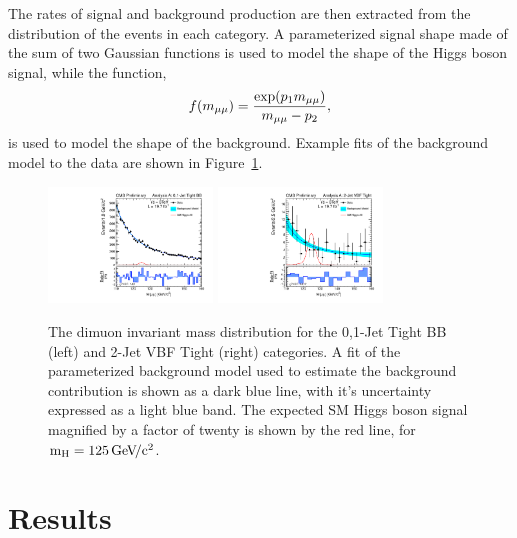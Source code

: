 \documentclass[10pt]{article}
\begin{document}
The rates of signal and background production are then extracted from the 
\Mmumu{} distribution of the
events in each category.  A parameterized signal shape made of the sum of
two Gaussian functions is used to model the shape of the Higgs boson signal, while
the function,
\begin{equation}
f(m_{\mu\mu}{}) = \frac{\exp(p_1 m_{\mu\mu}{})}{m_{\mu\mu}{}-p_2},
\end{equation}
is used to model the shape of the background.
Example fits of the background model to the data are shown in Figure~\ref{fig:mass}.


\begin{figure}[htb]
\centering
\includegraphics[width=0.39\textwidth]{plotsPublic/mass_AnanlysisA/pdf/CombSplitAll_8TeV_125_Jets01PassPtG10BB.pdf}
\includegraphics[width=0.39\textwidth]{plotsPublic/mass_AnanlysisA/pdf/CombSplitAll_8TeV_125_Jet2CutsVBFPass.pdf}
\caption{ The dimuon invariant mass distribution for the 0,1-Jet Tight BB (left) and 2-Jet VBF Tight (right) categories.
            A fit of the parameterized background model used to estimate the background contribution is shown
            as a dark blue line, with it's uncertainty expressed as a light blue band.  The expected SM Higgs boson
            signal magnified by a factor of twenty is shown by the red line, for $\mathrm{m_H}{}=125\,\mathrm{Ge\kern -0.1em V\!/c^2}{}$.
            }
\label{fig:mass}
\end{figure}

\section{Results}
\end{document}
